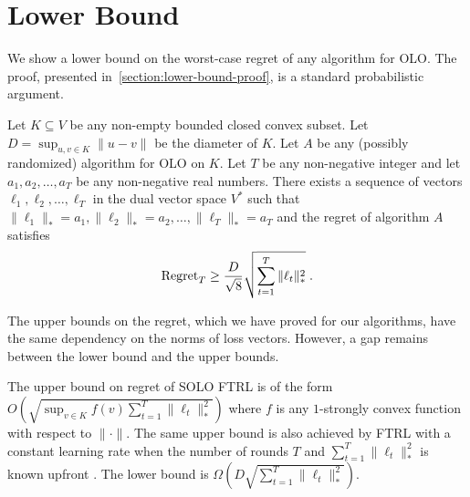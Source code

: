 \section{Lower Bound}
\label{section:lower-bound}

We show a lower bound on the worst-case regret of any algorithm for OLO. The
proof, presented in~\ref{section:lower-bound-proof}, is a standard
probabilistic argument.

\begin{theorem}
\label{theorem:simple-lower-bound}
Let $K \subseteq V$ be any non-empty bounded closed convex subset. Let $D =
\sup_{u,v \in K} \|u - v\|$ be the diameter of $K$. Let $A$ be any (possibly
randomized) algorithm for OLO on $K$. Let $T$ be any non-negative integer and
let $a_1, a_2, \dots, a_T$ be any non-negative real numbers.  There exists a
sequence of vectors $\ell_1, \ell_2, \dots, \ell_T$ in the dual vector space
$V^*$ such that $\|\ell_1\|_* = a_1, \|\ell_2\|_* = a_2, \dots, \|\ell_T\|_* =
a_T$ and the regret of algorithm $A$ satisfies
\begin{equation}
\label{equation:simple-lower-bound}
\operatorname{Regret}_T \ge \frac{D}{\sqrt{8}} \sqrt{\sum_{t=1}^T\|\ell_t\|_*^2} \; .
\end{equation}
\end{theorem}

The upper bounds on the regret, which we have proved for our algorithms, have
the same dependency on the norms of loss vectors.  However, a gap remains
between the lower bound and the upper bounds.

The upper bound on regret of \textsc{SOLO FTRL} is of
the form $O(\sqrt{\sup_{v \in K} f(v) \sum_{t=1}^T \|\ell_t\|_*^2})$ where $f$
is any $1$-strongly convex function with respect to $\|\cdot\|$.  The same
upper bound is also achieved by \textsc{FTRL} with a constant learning rate
when the number of rounds $T$ and $\sum_{t=1}^T \|\ell_t\|_*^2$ is known
upfront \cite[Chapter 2]{Shalev-Shwartz-2011}.  The lower bound is
$\Omega(D\sqrt{\sum_{t=1}^T \|\ell_t\|_*^2})$.

